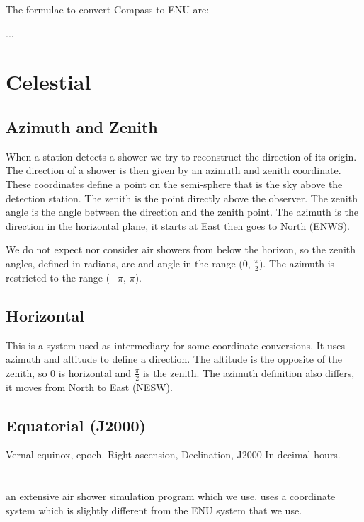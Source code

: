 The formulae to convert Compass to ENU are:

...


\section{Celestial}

\subsection{Azimuth and Zenith}

When a station detects a shower we try to reconstruct the direction of
its origin. The direction of a shower is then given by an azimuth and
zenith coordinate. These coordinates define a point on the semi-sphere
that is the sky above the detection station. The zenith is the point
directly above the observer. The zenith angle is the angle between the
direction and the zenith point. The azimuth is the direction in the
horizontal plane, it starts at East then goes to North (ENWS).

We do not expect nor consider air showers from below the horizon, so the
zenith angles, defined in radians, are and angle in the range (0,
$\frac{\pi}{2}$). The azimuth is restricted to the range ($-\pi$, $\pi$).


\subsection{Horizontal}

This is a system used as intermediary for some coordinate conversions.
It uses azimuth and altitude to define a direction. The altitude is the
opposite of the zenith, so 0 is horizontal and $\frac{\pi}{2}$ is the
zenith. The azimuth definition also differs, it moves from North to East
(NESW).


\subsection{Equatorial (J2000)}

Vernal equinox, epoch.
Right ascension, Declination, J2000
In decimal hours.


\section{\corsika}

\corsika an extensive air shower simulation program which we use.
\corsika uses a coordinate system which is slightly different from the
ENU system that we use\cite{corsika}.


